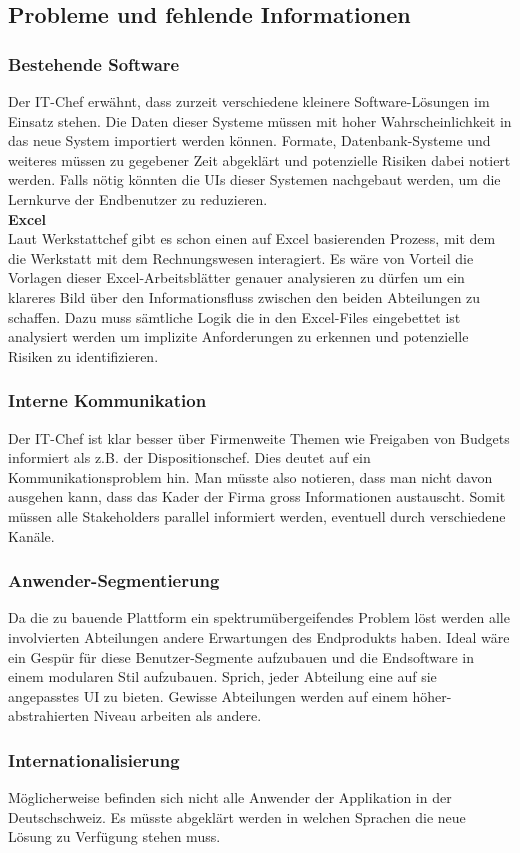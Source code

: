 \subsection{Probleme und fehlende Informationen}
%
  \subsubsection{Bestehende Software}
  Der IT-Chef erwähnt, dass zurzeit verschiedene kleinere Software-Lösungen im Einsatz stehen.
  Die Daten dieser Systeme müssen mit hoher Wahrscheinlichkeit in das neue System importiert werden können.
  Formate, Datenbank-Systeme und weiteres müssen zu gegebener Zeit abgeklärt und potenzielle Risiken dabei notiert werden.
  Falls nötig könnten die UIs dieser Systemen nachgebaut werden, um die Lernkurve der Endbenutzer zu reduzieren.\\[2ex]
%
  \textbf{Excel}\\
  Laut Werkstattchef gibt es schon einen auf Excel basierenden Prozess, mit dem die Werkstatt mit dem Rechnungswesen interagiert.
  Es wäre von Vorteil die Vorlagen dieser Excel-Arbeitsblätter genauer analysieren zu dürfen um ein klareres Bild über den Informationsfluss zwischen den beiden Abteilungen zu schaffen.
  Dazu muss sämtliche Logik die in den Excel-Files eingebettet ist analysiert werden um implizite Anforderungen zu erkennen und potenzielle Risiken zu identifizieren.
  
  \subsubsection{Interne Kommunikation}
  Der IT-Chef ist klar besser über Firmenweite Themen wie Freigaben von Budgets informiert als z.B. der Dispositionschef. Dies deutet auf ein Kommunikationsproblem hin.
  Man müsste also notieren, dass man nicht davon ausgehen kann, dass das Kader der Firma gross Informationen austauscht. Somit müssen alle Stakeholders parallel informiert werden, eventuell durch verschiedene Kanäle.

  \subsubsection{Anwender-Segmentierung}
  Da die zu bauende Plattform ein spektrumübergeifendes Problem löst werden alle involvierten Abteilungen andere Erwartungen des Endprodukts haben.
  Ideal wäre ein Gespür für diese Benutzer-Segmente aufzubauen und die Endsoftware in einem modularen Stil aufzubauen. Sprich, jeder Abteilung eine auf sie angepasstes UI zu bieten.
  Gewisse Abteilungen werden auf einem höher-abstrahierten Niveau arbeiten als andere.
  
  \subsubsection{Internationalisierung}
  Möglicherweise befinden sich nicht alle Anwender der Applikation in der Deutschschweiz. Es müsste abgeklärt werden in welchen Sprachen die neue Lösung zu Verfügung stehen muss.
